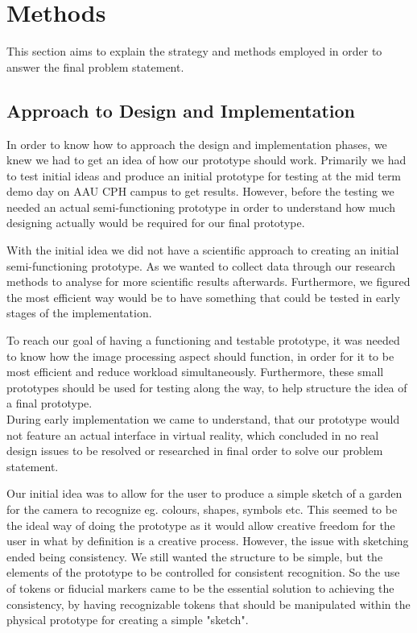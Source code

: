 \chapter{Methods}
This section aims to explain the strategy and methods employed in order to answer the final problem statement. 

\section{Approach to Design and Implementation}

In order to know how to approach the design and implementation phases, we knew we had to get an idea of how our prototype should work. Primarily we had to test initial ideas and produce an initial prototype for testing at the mid term demo day on AAU CPH campus to get results. However, before the testing we needed an actual semi-functioning prototype in order to understand how much designing actually would be required for our final prototype.

With the initial idea we did not have a scientific approach to creating an initial semi-functioning prototype. As we wanted to collect data through our research methods to analyse for more scientific results afterwards. Furthermore, we figured the most efficient way would be to have something that could be tested in early stages of the implementation.

To reach our goal of having a functioning and testable prototype, it was needed to know how the image processing aspect should function, in order for it to be most efficient and reduce workload simultaneously. Furthermore, these small prototypes should be used for testing along the way, to help structure the idea of a final prototype. \\

During early implementation we came to understand, that our prototype would not feature an actual interface in virtual reality, which concluded in no real design issues to be resolved or researched in final order to solve our problem statement. 

Our initial idea was to allow for the user to produce a simple sketch of a garden for the camera to recognize eg. colours, shapes, symbols etc. This seemed to be the ideal way of doing the prototype as it would allow creative freedom for the user in what by definition is a creative process. However, the issue with sketching ended being consistency. We still wanted the structure to be simple, but the elements of the prototype to be controlled for consistent recognition. So the use of tokens or fiducial markers came to be the essential solution to achieving the consistency, by having recognizable tokens that should be manipulated within the physical prototype for creating a simple "sketch".

